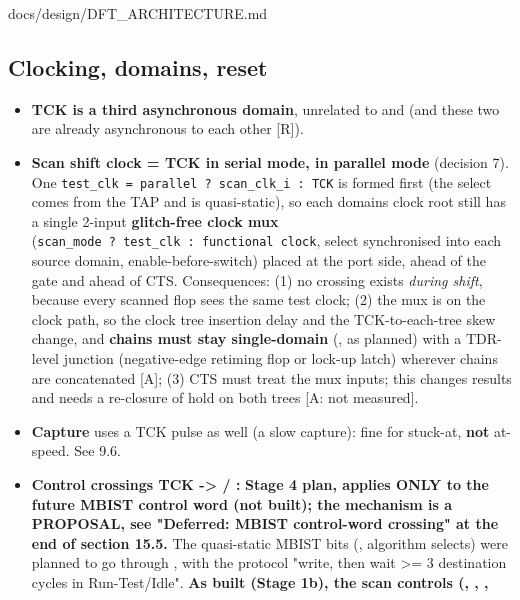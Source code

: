 \begin{relocated}{docs/design/DFT_ARCHITECTURE.md}
\subsection{Clocking, domains, reset}\label{tm:ch:dft-architecture:93-clocking-domains-reset}

\begin{itemize}
\tightlist
\item
  \textbf{TCK is a third asynchronous domain}, unrelated to 
  and  (and these two are already asynchronous to each
  other {[}R{]}).
\item
  \textbf{Scan shift clock = TCK in serial mode,  in
  parallel mode} (decision 7). One
  \texttt{test\_\allowbreak{}clk\ =\allowbreak{}\ parallel\ ?\ scan\_\allowbreak{}clk\_\allowbreak{}i\ :\allowbreak{}\ TCK}
  is formed first (the select comes from the TAP and is quasi-static),
  so each domain\textquotesingle s clock root still has a single 2-input
  \textbf{glitch-free clock mux}
  (\texttt{scan\_\allowbreak{}mode\ ?\ test\_\allowbreak{}clk\ :\allowbreak{}\ functional\ clock},
  select synchronised into each source domain, enable-before-switch)
  placed at the port side, ahead of the  gate and ahead
  of CTS. Consequences: (1) no crossing exists \emph{during shift},
  because every scanned flop sees the same test clock; (2) the mux is on
  the clock path, so the clock tree insertion delay and the
  TCK-to-each-tree skew change, and \textbf{chains must stay
  single-domain} (, as planned) with a TDR-level junction
  (negative-edge retiming flop or lock-up latch) wherever chains are
  concatenated {[}A{]}; (3) CTS must treat the mux inputs; this changes
   results and needs a re-closure of hold on both trees {[}A:
  not measured{]}.
\item
  \textbf{Capture} uses a TCK pulse as well (a slow capture): fine for
  stuck-at, \textbf{not} at-speed. See 9.6.
\item
  \textbf{Control crossings TCK -\textgreater{}  /
  :} \textbf{Stage 4 plan, applies ONLY to the future
  MBIST control word (not built); the mechanism is a PROPOSAL, see
  "Deferred: MBIST control-word crossing" at the end of section 15.5.}
  The quasi-static MBIST bits (, algorithm selects) were
  planned to go through , with the protocol "write, then
  wait \textgreater= 3 destination cycles in
  Run-Test/\allowbreak{}Idle". \textbf{As built (Stage 1b), the scan
  controls (, , ,
}
\end{itemize}
\end{relocated}
